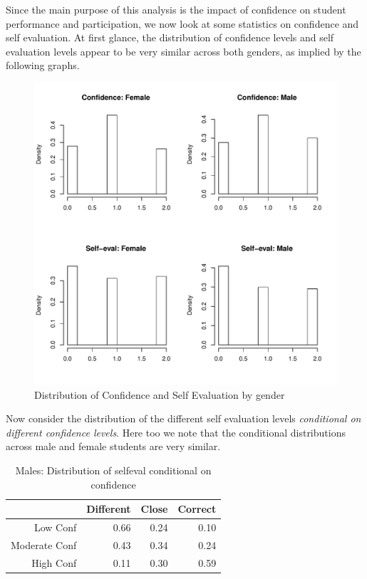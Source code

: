 \documentclass[11pt]{article} %
\begin{document}
\noindent
Since the main purpose of this analysis is the impact of confidence on student performance and participation, we now look at some statistics on confidence and self evaluation. At first glance, the distribution of confidence levels and self evaluation levels appear to be very similar across both genders, as implied by the following graphs. 
\begin{figure}[H]
\caption{Distribution of Confidence and Self Evaluation by gender}
\centering
\includegraphics[width = 0.65 \textwidth]{comparison2.pdf}
\end{figure}
\noindent
Now consider the distribution of the different self evaluation levels \textit{conditional on different confidence levels}. Here too we note that the conditional distributions across male and female students are very similar. 


% 
\begin{table}[H]\small
\centering
\caption{Males: Distribution of selfeval conditional on confidence}
\begin{tabular}{rrrr}
  \hline
 & Different & Close & Correct \\ 
  \hline
Low Conf & 0.66 & 0.24 & 0.10 \\ 
  Moderate Conf & 0.43 & 0.34 & 0.24 \\ 
  High Conf & 0.11 & 0.30 & 0.59 \\ 
   \hline
\end{tabular}
\end{table}
% 
\end{document}
